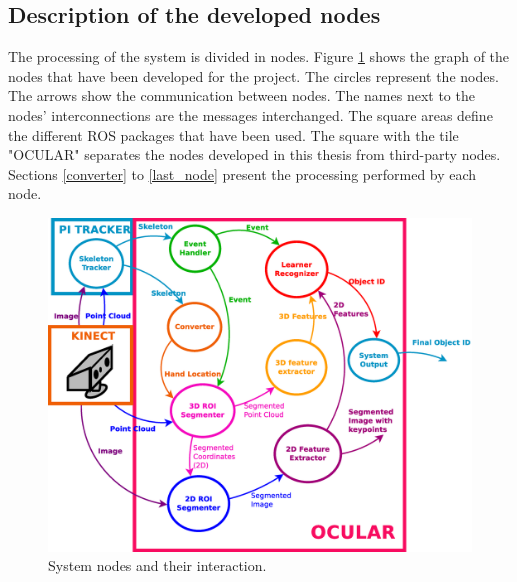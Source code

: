 \subsection{Description of the developed nodes}
\label{nodes}


The processing of the system is divided in nodes. 
Figure \ref{nodes_graph} shows the graph of the nodes that have been developed for the project.
The circles represent the nodes. %
The arrows show the communication between nodes. 
The names next to the nodes' interconnections are the messages interchanged.  %
The square areas define the different ROS packages that have been used.
The square with the tile "OCULAR" separates the nodes developed in this thesis from third-party nodes. 
Sections \ref{converter} to \ref{last_node} present the processing performed by each node. 
\\


		\begin{figure}[H]
			\begin{center}
			\includegraphics[width=\linewidth]{img/diagrams/nodes.eps}
			\caption[System nodes]{System nodes and their interaction.}
			\label{nodes_graph}
			\end{center}
		\end{figure}

